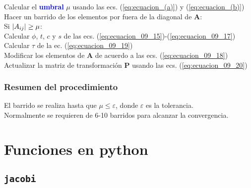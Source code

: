 \documentclass[12pt]{beamer}
\begin{document}
\begin{frame}
\begin{tcolorbox}[colback=bisque, title=Resumen del procedimiento]
Calcular el \textbf{\textcolor{blue}{umbral}} $\mu$ usando las ecs. (\ref{eq:ecuacion_(a)}) y (\ref{eq:ecuacion_(b)})
\\ \pause
Hacer un barrido de los elementos por fuera de la diagonal de $\mathbf{A}$:
\\ \pause
\hspace{0.5cm} Si $\abs{ A_{ij} } \geq \mu$:
\\ \pause
\hspace{1cm} Calcular $\phi$, $t$, $c$ y $s$ de las ecs. (\ref{eq:ecuacion_09_15})-(\ref{eq:ecuacion_09_17})
\\ \pause
\hspace{1cm} Calcular $\tau$ de la ec. (\ref{eq:ecuacion_09_19})
\\ \pause
\hspace{1cm} Modificar los elementos de $\mathbf{A}$ de acuerdo a las ecs. (\ref{eq:ecuacion_09_18})
\\ \pause
\hspace{1cm} Actualizar la matriz de transformación $\mathbf{P}$ usando las ecs. (\ref{eq:ecuacion_09_20})
\end{tcolorbox}
\end{frame}
\begin{frame}
\frametitle{Resumen del procedimiento}
El barrido se realiza hasta que $\mu \leq \varepsilon$, donde $\varepsilon$ es la tolerancia.
\\
\bigskip
\pause
Normalmente se requieren de 6-10 barridos para alcanzar la convergencia.
\end{frame}

\section{Funciones en python}
\subsection{\texttt{jacobi}}
\end{document}
